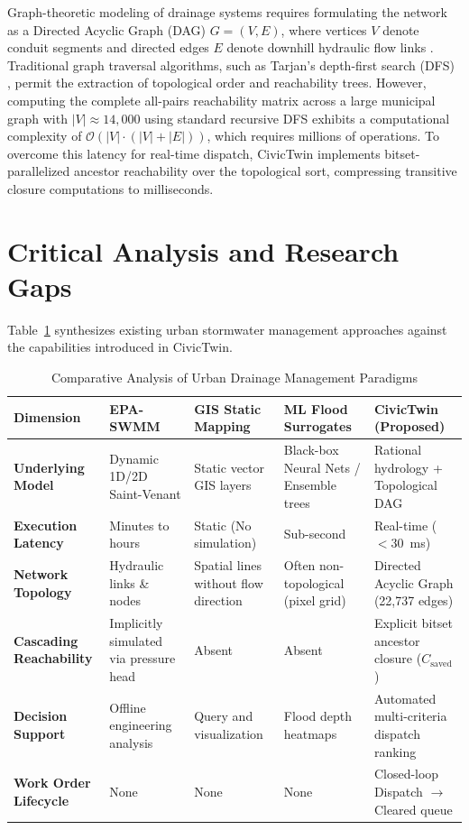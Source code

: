 \documentclass[12pt,a4paper]{report}
\begin{document}
Graph-theoretic modeling of drainage systems requires formulating the network as a Directed Acyclic Graph (DAG) $G = (V, E)$, where vertices $V$ denote conduit segments and directed edges $E$ denote downhill hydraulic flow links \cite{diestel2017graph}. Traditional graph traversal algorithms, such as Tarjan's depth-first search (DFS) \cite{tarjan1972depth}, permit the extraction of topological order and reachability trees. However, computing the complete all-pairs reachability matrix across a large municipal graph with $|V| \approx 14,000$ using standard recursive DFS exhibits a computational complexity of $\mathcal{O}(|V| \cdot (|V| + |E|))$, which requires millions of operations. To overcome this latency for real-time dispatch, CivicTwin implements bitset-parallelized ancestor reachability over the topological sort, compressing transitive closure computations to milliseconds.

\section{Critical Analysis and Research Gaps}
Table~\ref{tab:lit_comparison} synthesizes existing urban stormwater management approaches against the capabilities introduced in CivicTwin.

\begin{table}[h!]
\centering
\caption{Comparative Analysis of Urban Drainage Management Paradigms}
\label{tab:lit_comparison}
\fontsize{9pt}{11pt}\selectfont
\begin{tabular}{|p{3.2cm}|p{2.6cm}|p{2.6cm}|p{2.8cm}|p{3.2cm}|}
\hline
\textbf{Dimension} & \textbf{EPA-SWMM} \cite{rossman2015storm} & \textbf{GIS Static Mapping} & \textbf{ML Flood Surrogates} \cite{kabir2020deep} & \textbf{CivicTwin (Proposed)} \\
\hline
\textbf{Underlying Model} & Dynamic 1D/2D Saint-Venant & Static vector GIS layers & Black-box Neural Nets / Ensemble trees & Rational hydrology + Topological DAG \\
\hline
\textbf{Execution Latency} & Minutes to hours & Static (No simulation) & Sub-second & Real-time ($< 30$~ms) \\
\hline
\textbf{Network Topology} & Hydraulic links \& nodes & Spatial lines without flow direction & Often non-topological (pixel grid) & Directed Acyclic Graph (22,737 edges) \\
\hline
\textbf{Cascading Reachability} & Implicitly simulated via pressure head & Absent & Absent & Explicit bitset ancestor closure ($C_{\text{saved}}$) \\
\hline
\textbf{Decision Support} & Offline engineering analysis & Query and visualization & Flood depth heatmaps & Automated multi-criteria dispatch ranking \\
\hline
\textbf{Work Order Lifecycle} & None & None & None & Closed-loop Dispatch $\rightarrow$ Cleared queue \\
\hline
\end{tabular}
\end{table}
\end{document}
